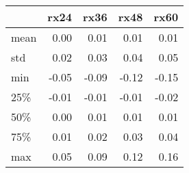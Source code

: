 \begin{tabular}{lrrrr}
\toprule
{} &  rx24 &  rx36 &  rx48 &  rx60 \\
\midrule
mean &  0.00 &  0.01 &  0.01 &  0.01 \\
std  &  0.02 &  0.03 &  0.04 &  0.05 \\
min  & -0.05 & -0.09 & -0.12 & -0.15 \\
25\%  & -0.01 & -0.01 & -0.01 & -0.02 \\
50\%  &  0.00 &  0.01 &  0.01 &  0.01 \\
75\%  &  0.01 &  0.02 &  0.03 &  0.04 \\
max  &  0.05 &  0.09 &  0.12 &  0.16 \\
\bottomrule
\end{tabular}
